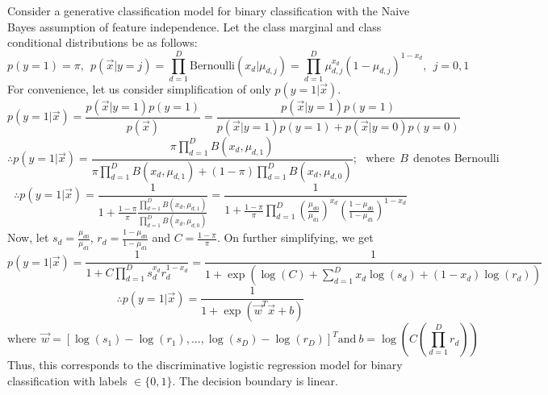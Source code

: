 \documentclass[a4paper,11pt]{article}
\begin{document}
\begin{mlsolution} 
Consider a generative classification model for binary classification with the Naive Bayes assumption of feature independence. Let the class marginal and class conditional distributions be as follows:
\[
p(y = 1) = \pi, \ \ p(\vec{x}| y = j) = \prod_{d=1}^{D}\text{Bernoulli}(x_d | \mu_{d,j}) = \prod_{d=1}^{D} \mu_{d,j}^{x_d}(1- \mu_{d,j})^{1-x_d}, \ \ j = 0,1
\]
For convenience, let us consider simplification of only $p(y = 1 | \vec{x})$.
\[
p(y = 1 | \vec{x}) = \frac{p(\vec{x} | y = 1)p(y=1)}{p(\vec{x})} = \frac{p(\vec{x} | y = 1)p(y=1)}{p(\vec{x} | y = 1)p(y=1) + p(\vec{x} | y = 0)p(y=0)}
\]
\[
\therefore p(y = 1 | \vec{x}) = \frac{\pi \prod_{d=1}^{D} B(x_d, \mu_{d,1})}{\pi \prod_{d=1}^{D}B(x_d, \mu_{d,1}) + (1- \pi) \prod_{d=1}^{D}B(x_d, \mu_{d,0})}; \ \ \ \text{where} \ \ B \ \ \text{denotes Bernoulli}
\]
\[
\therefore p(y = 1 | \vec{x}) = \frac{1}{1 + \frac{1-\pi}{\pi}\frac{\prod_{d=1}^{D}B(x_d, \mu_{d,1})}{\prod_{d=1}^{D}B(x_d, \mu_{d,0})}} = \frac{1}{1 + \frac{1-\pi}{\pi}\prod_{d=1}^{D}(\frac{\mu_{d0}}{\mu_{d1}})^{x_d}(\frac{1-\mu_{d0}}{1-\mu_{d1}})^{1-x_d}}
\]
Now, let $s_d = \frac{\mu_{d0}}{\mu_{d1}}$, $r_d = \frac{1-\mu_{d0}}{1-\mu_{d1}}$ and $C = \frac{1-\pi}{\pi}$. On further simplifying, we get
\[
p(y=1|\vec{x}) = \frac{1}{1 + C\prod_{d=1}^{D}s_{d}^{x_d}r_{d}^{1-x_d}} = \frac{1}{1 + \exp\left( \log(C) + \sum_{d=1}^{D}x_d\log(s_d) + (1-x_d)\log(r_d)\right) }
\]
\[
\therefore \boxed{p(y=1|\vec{x}) = \frac{1}{1 + \exp(\vec{w}^{T}\vec{x} + b)}}  
\]
\[
\text{where} \ \ \vec{w} = [\log(s_1)-\log(r_1),...,\log(s_D)-\log(r_D)]^{T} \text{and} \  b = \log\left( C(\prod_{d=1}^{D}r_d)\right) 
\]
Thus, this corresponds to the discriminative logistic regression model for binary classification with  labels $\in \{0,1\}$. The decision boundary is linear.


\end{mlsolution}
\end{document}
